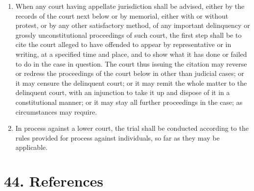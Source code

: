 \documentclass[
]{book}
\begin{document}
\begin{enumerate}
\item
  When any court having appellate jurisdiction shall be advised, either by the records of the court next below or by memorial, either with or without protest, or by any other satisfactory method, of any important delinquency or grossly unconstitutional proceedings of such court, the first step shall be to cite the court alleged to have offended to appear by representative or in writing, at a specified time and place, and to show what it has done or failed to do in the case in question. The court thus issuing the citation may reverse or redress the proceedings of the court below in other than judicial cases; or it may censure the delinquent court; or it may remit the whole matter to the delinquent court, with an injunction to take it up and dispose of it in a constitutional manner; or it may stay all further proceedings in the case; as circumstances may require.
\item
  In process against a lower court, the trial shall be conducted according to the rules provided for process against individuals, so far as they may be applicable.
\end{enumerate}

\hypertarget{references}{%
\section*{44. References}\label{references}}

\protect\hypertarget{chapter-slug-44-references}{\href{}{}}
\end{document}
